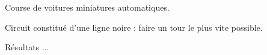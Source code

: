 \begin{frame}
Course de voitures miniatures automatiques.

Circuit constitué d'une ligne noire : faire un tour le plus vite possible.

\begin{block}{Résultats}
...
\end{block}

\end{frame}
